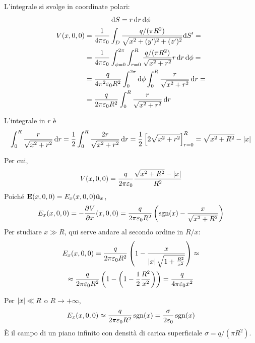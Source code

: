L'integrale si svolge in coordinate polari:
\begin{gather}
    \mathrm{d} S = r \, \mathrm{d} r \, \mathrm{d} \phi \\
\begin{aligned}
    V(x, 0, 0) & = \frac{1}{4\pi\varepsilon_0} \int_D \frac{q / (\pi R^2)}{\sqrt{x^2 + (y')^2 + (z')^2}} \mathrm{d} S' = \\
    & = \frac{1}{4\pi\varepsilon_0} \int_{\phi = 0}^{2\pi} \int_{r = 0}^R \frac{q / (\pi R^2)}{\sqrt{x^2 + r^2}} r \, \mathrm{d} r \, \mathrm{d} \phi = \\
    & = \frac{q}{4\pi^2\varepsilon_0 R^2} \int_{0}^{2\pi} \mathrm{d} \phi \int_0^R \frac{r}{\sqrt{x^2 + r^2}} \, \mathrm{d} r = \\
    & = \frac{q}{2\pi\varepsilon_0 R^2} \int_0^R \frac{r}{\sqrt{x^2 + r^2}} \, \mathrm{d} r
\end{aligned}
\end{gather}

L'integrale in $r$ è
\begin{equation}
    \int_0^R \frac{r}{\sqrt{x^2 + r^2}} \, \mathrm{d} r
    = \frac{1}{2} \int_0^R \frac{2r}{\sqrt{x^2 + r^2}} \, \mathrm{d} r
    = \frac{1}{2} \left[ 2 \sqrt{x^2 + r^2} \right]_{r=0}^R
    = \sqrt{x^2 + R^2} - \left\lvert x \right\rvert
\end{equation}

Per cui,
\begin{equation}
    V(x, 0, 0) = \frac{q}{2\pi\varepsilon_0} \frac{\sqrt{x^2 + R^2} - \left\lvert x \right\rvert}{R^2}
\end{equation}
Poiché $\mathbf{E}(x, 0, 0) = E_x(x, 0, 0) \hat{\mathbf{u}}_{x}$,
\begin{equation}
    E_x(x, 0, 0) = - \parder[\spot]{x}(x, 0, 0) = \frac{q}{2\pi\eps_0 R^2} \pts{\sgn{x} - \frac{x}{\sqrt{x^2 + R^2}}}
\end{equation}
Per studiare $x \gg R$, qui serve andare al secondo ordine in $R / x$:
\begin{equation}
\begin{gathered}
    E_x(x, 0, 0) = \frac{q}{2\pi\varepsilon_0 R^2} \left( 1 - \frac{x}{\left\lvert x \right\rvert\sqrt{1 + \frac{R^2}{x^2}}} \right) \approx \\
    \approx \frac{q}{2\pi\varepsilon_0 R^2} \left( 1 - \left( 1 - \frac{1}{2} \frac{R^2}{x^2} \right) \right)
    = \frac{q}{4\pi\varepsilon_0 x^2}
\end{gathered}
\end{equation}

Per $\left\lvert x \right\rvert \ll R$ o $R \to +\infty$,
\begin{equation}
    E_x(x, 0, 0) \approx \frac{q}{2\pi\varepsilon_0 R^2} \operatorname{sgn}(x) = \frac{\sigma}{2\varepsilon_0} \operatorname{sgn}(x)
\end{equation}
È il campo di un piano infinito con densità di carica superficiale $\sigma = q / (\pi R^2)$.

